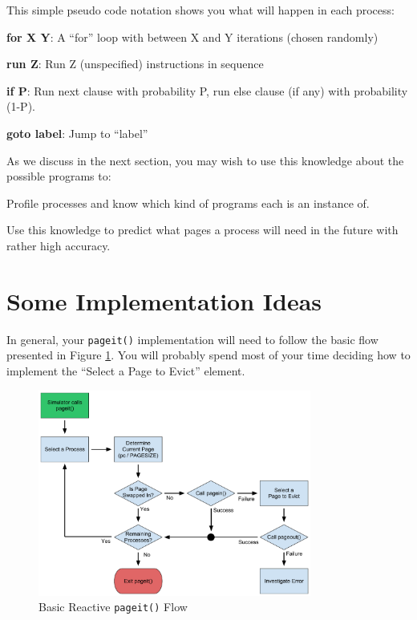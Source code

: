 \documentclass[12pt]{article}
\newenvironment{packed_enum}{
\begin{enumerate}
  \setlength{\itemsep}{1pt}
  \setlength{\parskip}{0pt}
  \setlength{\parsep}{0pt}
}{\end{enumerate}}
\newenvironment{packed_item}{
\begin{itemize}
  \setlength{\itemsep}{1pt}
  \setlength{\parskip}{0pt}
  \setlength{\parsep}{0pt}
}{\end{itemize}}
\begin{document}


This simple pseudo code notation shows you what will happen in each
process:
\begin{packed_item}
\item {\bf for X Y}: A ``for'' loop with between X and Y iterations
  (chosen randomly)
\item {\bf run Z}: Run Z (unspecified) instructions in sequence
\item {\bf if P}: Run next clause with probability P,
  run else clause (if any) with probability (1-P).
\item {\bf goto label}: Jump to ``label''
\end{packed_item}

As we discuss in the next section,
you may wish to use this knowledge about the possible programs to:
\begin{packed_enum}
\item Profile processes and know which kind of programs each is an
  instance of.
\item Use this knowledge to predict what pages a process will need
  in the future with rather high accuracy.
\end{packed_enum}

\section{Some Implementation Ideas}

In general, your \texttt{pageit()} implementation will need to follow
the basic flow presented in Figure \ref{fig:pageit-reactive}. You will
probably spend most of your time deciding how to implement the ``Select
a Page to Evict'' element.

\begin{figure}[htbp]
  \begin{center}
    \includegraphics[width=0.8\textwidth]{pageit-Fig1.pdf}
    \caption{Basic Reactive \texttt{pageit()} Flow}
    \label{fig:pageit-reactive}
  \end{center}
\end{figure}
\end{document}
